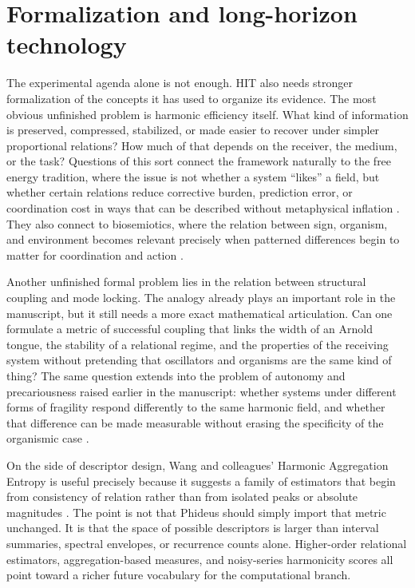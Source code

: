 \section{Formalization and long-horizon technology}


The experimental agenda alone is not enough. HIT also needs stronger formalization of the concepts it has used to organize its evidence. The most obvious unfinished problem is harmonic efficiency itself. What kind of information is preserved, compressed, stabilized, or made easier to recover under simpler proportional relations? How much of that depends on the receiver, the medium, or the task? Questions of this sort connect the framework naturally to the free energy tradition, where the issue is not whether a system “likes” a field, but whether certain relations reduce corrective burden, prediction error, or coordination cost in ways that can be described without metaphysical inflation \parencite{friston_2010}. They also connect to biosemiotics, where the relation between sign, organism, and environment becomes relevant precisely when patterned differences begin to matter for coordination and action \parencite{hoffmeyer_2008,barbieri_2008}.

Another unfinished formal problem lies in the relation between structural coupling and mode locking. The analogy already plays an important role in the manuscript, but it still needs a more exact mathematical articulation. Can one formulate a metric of successful coupling that links the width of an Arnold tongue, the stability of a relational regime, and the properties of the receiving system without pretending that oscillators and organisms are the same kind of thing? The same question extends into the problem of autonomy and precariousness raised earlier in the manuscript: whether systems under different forms of fragility respond differently to the same harmonic field, and whether that difference can be made measurable without erasing the specificity of the organismic case \parencite{dipaolo_2005,maturana_varela_1987}.

On the side of descriptor design, Wang and colleagues' Harmonic Aggregation Entropy is useful precisely because it suggests a family of estimators that begin from consistency of relation rather than from isolated peaks or absolute magnitudes \parencite{wang_haagen_2025}. The point is not that Phideus should simply import that metric unchanged. It is that the space of possible descriptors is larger than interval summaries, spectral envelopes, or recurrence counts alone. Higher-order relational estimators, aggregation-based measures, and noisy-series harmonicity scores all point toward a richer future vocabulary for the computational branch.

